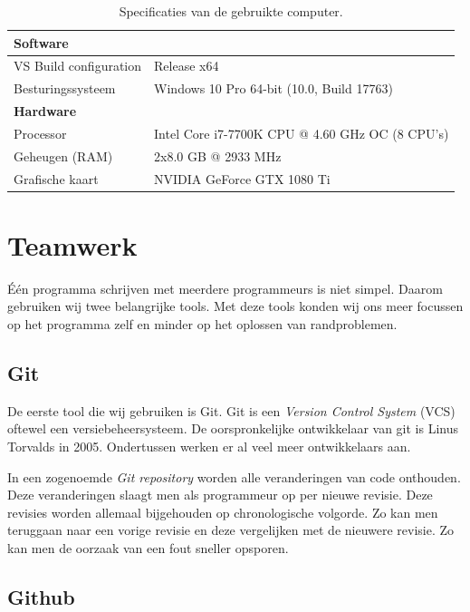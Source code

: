 \begin{table}[ht]
    \centering
    \begin{tabular}{|l|l|}
        \hline
        \multicolumn{2}{|l|}{\bfseries Software} \\
        \hline
        VS Build configuration  & Release x64 \\
        Besturingssysteem       & Windows 10 Pro 64-bit (10.0, Build 17763) \\
        \hline
        \hline
        \multicolumn{2}{|l|}{\bfseries Hardware} \\
        \hline
        Processor               & Intel Core i7-7700K CPU @ 4.60 GHz OC (8 CPU's) \\
        Geheugen (RAM)          & 2x8.0 GB @ 2933 MHz \\
        Grafische kaart         & NVIDIA GeForce GTX 1080 Ti \\
        \hline
    \end{tabular}
    \caption{Specificaties van de gebruikte computer.}
    \label{tab:pc-specs}
\end{table}

\clearpage

\section{Teamwerk}
Één programma schrijven met meerdere programmeurs is niet simpel. Daarom gebruiken wij twee belangrijke tools. Met deze tools konden wij ons meer focussen op het programma zelf en minder op het oplossen van randproblemen.

\subsection{Git}
De eerste tool die wij gebruiken is Git.
Git is een \textit{Version Control System} (VCS) oftewel een versiebeheersysteem. De oorspronkelijke ontwikkelaar van git is Linus Torvalds in 2005.\cite{git:init} Ondertussen werken er al veel meer ontwikkelaars aan.

In een zogenoemde \textit{Git repository} worden alle veranderingen van code onthouden. Deze veranderingen slaagt men als programmeur op per nieuwe revisie. Deze revisies worden allemaal bijgehouden op chronologische volgorde. Zo kan men teruggaan naar een vorige revisie en deze vergelijken met de nieuwere revisie. Zo kan men de oorzaak van een fout sneller opsporen.

\subsection{Github}

